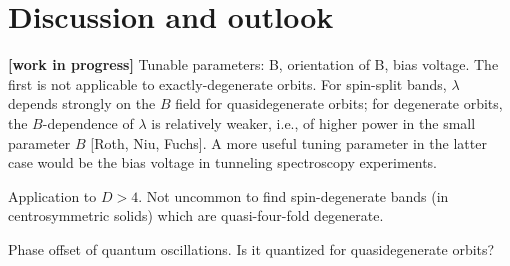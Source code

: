 \documentclass[aps, prb, showpacs, twocolumn, notitlepage, superscriptaddress]{revtex4-1}
\begin{document}


\section{Discussion and outlook}\label{sec:discussion}

\textbf{[work in progress]}
Tunable parameters: B, orientation of B, bias voltage. The first is not applicable to exactly-degenerate orbits.
For spin-split bands, $\lambda$ depends strongly on the $B$ field for quasidegenerate orbits; for degenerate orbits, the $B$-dependence of $\lambda$ is relatively weaker, i.e., of higher power in the small parameter $B$ [Roth, Niu, Fuchs]. A more useful tuning parameter in the latter case would be the bias voltage in tunneling spectroscopy experiments. 

Application to $D>4$. Not uncommon to find spin-degenerate bands (in centrosymmetric solids) which are quasi-four-fold degenerate.

Phase offset of quantum oscillations. Is it quantized for quasidegenerate orbits?

\end{document}
